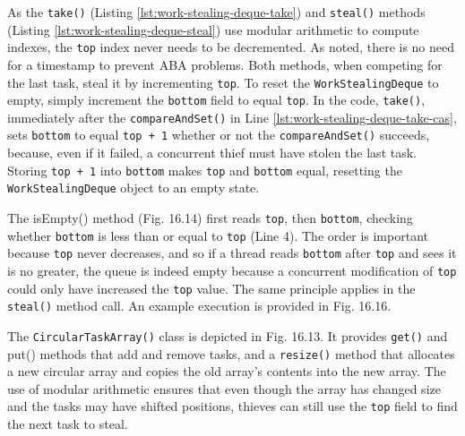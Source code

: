 As the \lstinline!take()! (Listing \ref{lst:work-stealing-deque-take})
and \lstinline!steal()!  methods (Listing
\ref{lst:work-stealing-deque-steal}) use modular arithmetic to compute
indexes, the \lstinline!top! index never needs to be decremented. As
noted, there is no need for a timestamp to prevent ABA problems. Both
methods, when competing for the last task, steal it by incrementing
\lstinline!top!. To reset the \lstinline!WorkStealingDeque! to empty,
simply increment the \lstinline!bottom! field to equal
\lstinline!top!. In the code, \lstinline!take()!, immediately after
the \lstinline!compareAndSet()! in Line
\ref{lst:work-stealing-deque-take-cas}, sets \lstinline!bottom! to
equal \lstinline!top + 1! whether or not the
\lstinline!compareAndSet()! succeeds, because, even if it failed, a
concurrent thief must have stolen the last task. Storing
\lstinline!top + 1! into \lstinline!bottom! makes \lstinline!top! and
\lstinline!bottom! equal, resetting the \lstinline!WorkStealingDeque!
object to an empty state.





The isEmpty() method (Fig. 16.14) first reads \lstinline!top!, then
\lstinline!bottom!, checking whether \lstinline!bottom! is less than
or equal to \lstinline!top! (Line 4). The order is important because
\lstinline!top! never decreases, and so if a thread reads
\lstinline!bottom! after \lstinline!top! and sees it is no greater,
the queue is indeed empty because a concurrent modification of
\lstinline!top! could only have increased the \lstinline!top!
value. The same principle applies in the \lstinline!steal()! method
call. An example execution is provided in Fig. 16.16.

The \lstinline!CircularTaskArray()! class is depicted in
Fig. 16.13. It provides \lstinline!get()! and put() methods that add
and remove tasks, and a \lstinline!resize()! method that allocates a
new circular array and copies the old array's contents into the new
array. The use of modular arithmetic ensures that even though the
array has changed size and the tasks may have shifted positions,
thieves can still use the \lstinline!top! field to find the next task
to steal.

